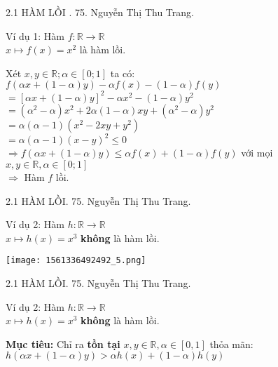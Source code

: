 \begin{frame}{2.1 HÀM LỒI .\hspace{6cm}  75. Nguyễn Thị Thu Trang.} 
\begin{block}{Ví dụ 1: }
Hàm $f: \mathbb{R} \longrightarrow \mathbb{R}$\\
\hspace{1cm} $x\longmapsto f(x)= x^2$ là hàm lồi.
\end{block} 
Xét $x,y \in \mathbb{R}; \alpha \in [0; 1]$ ta có: \\$f(\alpha x + (1- \alpha)y) - \alpha f(x) - (1-\alpha) f(y)$\\
\pause
$= [\alpha x + (1- \alpha) y ]^2 - \alpha x^2 - (1-\alpha) y^2$ \\
\pause
$= (\alpha^2 -\alpha) x^2 + 2\alpha (1-\alpha) xy + (\alpha^2-\alpha) y^2$\\
\pause
$= \alpha(\alpha-1)(x^2- 2xy+y^2)$\\
\pause
$=\alpha(\alpha-1)(x-y)^2 \leq 0$\\
$\Rightarrow f(\alpha x + (1- \alpha)y)\leq \alpha f(x) + (1-\alpha) f(y)$ với mọi $x, y \in \mathbb{R}, \alpha \in [0; 1]$\\
$\Rightarrow$  Hàm $f$ lồi.
\end{frame}
\begin{frame}{2.1 HÀM LỒI. \hspace{6cm}  75. Nguyễn Thị Thu Trang.}
\begin{block}{Ví dụ 2: }
Hàm $h: \mathbb{R} \longrightarrow \mathbb{R}$\\
\hspace{1.2cm} $x\longmapsto h(x)= x^3$ \textbf{không} là hàm lồi.
\end{block}
\begin{center}
    \texttt{[image: 1561336492492\_5.png]}
\end{center}
\end{frame}
\begin{frame}{2.1 HÀM LỒI. \hspace{6cm}  75. Nguyễn Thị Thu Trang.}
\begin{block}{Ví dụ 2: }
Hàm $h: \mathbb{R} \longrightarrow \mathbb{R}$\\
\hspace{1.2cm} $x\longmapsto h(x)= x^3$ \textbf{không} là hàm lồi.
\end{block}
\textbf{Mục tiêu:} Chỉ ra \textbf{tồn tại} $x,y \in \mathbb{R}, \alpha \in [0,1]$ thỏa mãn: $h(\alpha x+(1 -\alpha)y) > \alpha h(x) + (1-\alpha)h(y)$\\
\end{frame}
